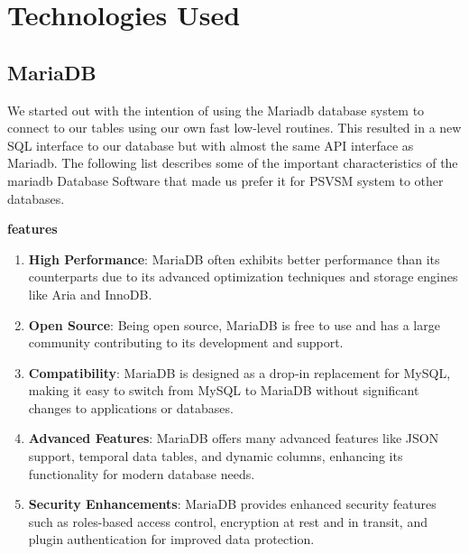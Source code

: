 \documentclass[a4paper, 12pt]{report}
\begin{document}
\section{Technologies Used}
\subsection{MariaDB}
\noindent We started out with the intention of using the Mariadb database system to connect to our tables
using our own fast low-level routines. This resulted in a new SQL interface to our database but
with almost the same API interface as Mariadb.
The following list describes some of the important characteristics of the mariadb Database
Software that made us prefer it for PSVSM system to other databases.\par 
\indent \textbf{features}
\begin{enumerate}
  \item \textbf{High Performance}: MariaDB often exhibits better performance than its counterparts due to its advanced optimization techniques and storage engines like Aria and InnoDB.
  
  \item \textbf{Open Source}: Being open source, MariaDB is free to use and has a large community contributing to its development and support.
  
  \item \textbf{Compatibility}: MariaDB is designed as a drop-in replacement for MySQL, making it easy to switch from MySQL to MariaDB without significant changes to applications or databases.
  
  \item \textbf{Advanced Features}: MariaDB offers many advanced features like JSON support, temporal data tables, and dynamic columns, enhancing its functionality for modern database needs.
  
  \item \textbf{Security Enhancements}: MariaDB provides enhanced security features such as roles-based access control, encryption at rest and in transit, and plugin authentication for improved data protection.
\end{enumerate}
\end{document}
